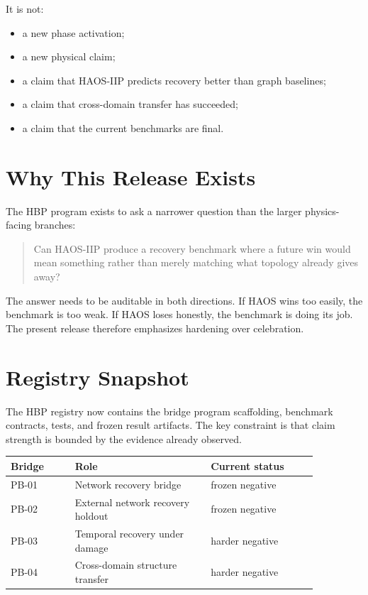 \documentclass[11pt]{article}
\begin{document}
It is not:
\begin{itemize}
\item a new phase activation;
\item a new physical claim;
\item a claim that HAOS-IIP predicts recovery better than graph baselines;
\item a claim that cross-domain transfer has succeeded;
\item a claim that the current benchmarks are final.
\end{itemize}

\section{Why This Release Exists}

The HBP program exists to ask a narrower question than the larger physics-facing branches:

\begin{quote}
Can HAOS-IIP produce a recovery benchmark where a future win would mean something rather than merely matching what topology already gives away?
\end{quote}

The answer needs to be auditable in both directions. If HAOS wins too easily, the benchmark is too weak. If HAOS loses honestly, the benchmark is doing its job. The present release therefore emphasizes hardening over celebration.

\section{Registry Snapshot}

The HBP registry now contains the bridge program scaffolding, benchmark contracts, tests, and frozen result artifacts. The key constraint is that claim strength is bounded by the evidence already observed.

\begin{longtable}{p{0.18\linewidth}p{0.38\linewidth}p{0.30\linewidth}}
\toprule
Bridge & Role & Current status \\
\midrule
PB-01 & Network recovery bridge & frozen negative \\
PB-02 & External network recovery holdout & frozen negative \\
PB-03 & Temporal recovery under damage & harder negative \\
PB-04 & Cross-domain structure transfer & harder negative \\
\bottomrule
\end{longtable}
\end{document}

